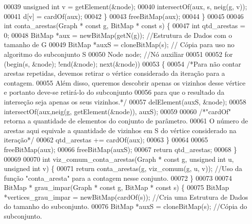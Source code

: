 \begin{DoxyCode}
00039                 \textcolor{keywordtype}{unsigned} \textcolor{keywordtype}{int} v = getElement(&node);
00040                 intersectOf(aux, s, neig(g, v));
00041                 d[v] = cardOf(aux);
00042         \}
00043         freeBitMap(aux);
00044 \}
00045 
00046 \textcolor{keywordtype}{int} conta_arestas(Graph * \textcolor{keyword}{const} g, BitMap * \textcolor{keyword}{const} s) \{
00047         \textcolor{keywordtype}{int} qtd\_arestas = 0;
00048         BitMap *aux = newBitMap(getN(g)); \textcolor{comment}{//Estrutura de Dados com o tamanho de G}
00049         BitMap *auxS = cloneBitMap(s); \textcolor{comment}{// Cópia para uso no algoritmo do subconjunto S}
00050         Node node; \textcolor{comment}{//Nó auxiliar}
00051 
00052         \textcolor{keywordflow}{for} (begin(s, &node); !end(&node); next(&node)) 
00053         \{
00054                 \textcolor{comment}{/*Para não contar arestas repetidas, devemos retirar o vértice considerado da iteração para
       a contagem.}
00055 \textcolor{comment}{                Além disso, queremos descobrir apenas os vizinhos desse vértice e portanto deve-se
       retirá-lo do subconjunto }
00056 \textcolor{comment}{                para que o resultado da interseção seja apenas os seus vizinhos.*/}
00057                 delElement(auxS, &node);
00058                 intersectOf(aux,neig(g, getElement(&node)), auxS);
00059 
00060                 \textcolor{comment}{/*"cardOf" retorna a quantidade de elementos do conjunto de parâmetro.}
00061 \textcolor{comment}{                O número de arestas aqui equivale a quantidade de vizinhos em S do vértice considerado na
       iteração*/}
00062                 qtd\_arestas += cardOf(aux);
00063         \}       
00064 
00065         freeBitMap(aux);
00066         freeBitMap(auxS);
00067         \textcolor{keywordflow}{return} qtd\_arestas;
00068 \}
00069 
00070 \textcolor{keywordtype}{int} viz_comum_conta_arestas(Graph * \textcolor{keyword}{const} g, \textcolor{keywordtype}{unsigned} \textcolor{keywordtype}{int} u, \textcolor{keywordtype}{unsigned} \textcolor{keywordtype}{int} v) \{
00071         \textcolor{keywordflow}{return} conta_arestas(g, viz_comum(g, u, v)); \textcolor{comment}{//Uso da função "conta\_aresta" para a contagem nesse
       conjunto.}
00072 \}
00073 
00074 BitMap * grau_impar(Graph * \textcolor{keyword}{const} g, BitMap * \textcolor{keyword}{const} s) \{        
00075         BitMap *vertices\_grau\_impar = newBitMap(cardOf(s)); \textcolor{comment}{//Cria uma Estrutura de Dados do tamanho do
       subconjunto.}
00076         BitMap *auxS = cloneBitMap(s); \textcolor{comment}{//Cópia do subconjunto.}

\end{DoxyCode}
